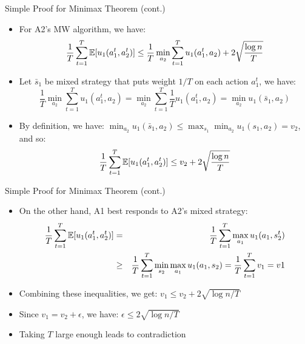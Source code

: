 \documentclass[11pt,aspectratio=169]{beamer}
\begin{document}
  
  \begin{frame}{Simple Proof for Minimax Theorem (cont.)}
   \begin{itemize}[<+->]\small
    \item For A2's MW algorithm, we have:
    $$\frac{1}{T} \sum_{t=1}^T \operatorname{\mathbb{E}}[u_1(a_1^t,a_2^t)] \le \frac{1}{T} \min_{a_2} \sum_{t=1}^T u_1(a_1^t,a_2) + 2\sqrt{\frac{\log n}{T}}$$
    \item Let $\bar{s}_1$ be mixed strategy that puts weight $1/T$ on each action $a_1^t$, we have:
    $$\frac{1}{T} \min_{a_2} \sum_{t=1}^T u_1(a_1^t,a_2) = \min_{a_2} \sum_{t=1}^T \frac{1}{T} u_1(a_1^t,a_2) = \min_{a_2} u_1(\bar{s}_1, a_2)$$
    \item By definition, we have: $\min_{a_2} u_1(\bar{s}_1, a_2) \le \max_{s_1} \min_{a_2} u_1(s_1, a_2) = v_2$, and so:
    $$\frac{1}{T} \sum_{t=1}^T \operatorname{\mathbb{E}}[u_1(a_1^t,a_2^t)] \le v_2 + 2\sqrt{\frac{\log n}{T}}$$
   \end{itemize}
  \end{frame}
  
  
  \begin{frame}{Simple Proof for Minimax Theorem (cont.)}
   \begin{itemize}[<+->]
    \item On the other hand, A1 best responds to A2's mixed strategy:
    \begin{eqnarray*}
     \frac{1}{T}\sum_{t=1}^T\operatorname{\mathbb{E}}[u_1(a_1^t,a_2^t)] & = & \frac{1}{T}\sum_{t=1}^T \max_{a_1}u_1(a_1,s_2^t) \\
     & \geq & \frac{1}{T}\sum_{t=1}^T \min_{s_2} \max_{a_1} u_1(a_1,s_2) = \frac{1}{T}\sum_{t=1}^T v_1 = v1\\
    \end{eqnarray*}
    \item Combining these inequalities, we get: $v_1 \leq v_2 + 2\sqrt{\log n/T}$
    \item Since $v_1 = v_2 + \epsilon$, we have: $\epsilon \leq 2\sqrt{\log n/T}$
    \item Taking $T$ large enough leads to contradiction
   \end{itemize}
  \end{frame}
  
\end{document}
